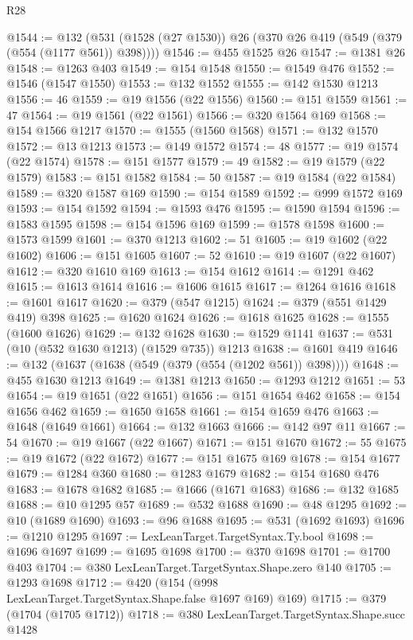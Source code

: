 \begin{lexlean}{R28}
\begin{coremodule}
@1544 := @132 (@531 (@1528 (@27 @1530)) @26 (@370 @26 @419 (@549 (@379 (@554 (@1177 @561)) @398))))
@1546 := @455 @1525 @26
@1547 := @1381 @26
@1548 := @1263 @403
@1549 := @154 @1548
@1550 := @1549 @476
@1552 := @1546 (@1547 @1550)
@1553 := @132 @1552
@1555 := @142 @1530 @1213
@1556 := 46
@1559 := @19 @1556 (@22 @1556)
@1560 := @151 @1559
@1561 := 47
@1564 := @19 @1561 (@22 @1561)
@1566 := @320 @1564 @169
@1568 := @154 @1566 @1217
@1570 := @1555 (@1560 @1568)
@1571 := @132 @1570
@1572 := @13 @1213
@1573 := @149 @1572
@1574 := 48
@1577 := @19 @1574 (@22 @1574)
@1578 := @151 @1577
@1579 := 49
@1582 := @19 @1579 (@22 @1579)
@1583 := @151 @1582
@1584 := 50
@1587 := @19 @1584 (@22 @1584)
@1589 := @320 @1587 @169
@1590 := @154 @1589
@1592 := @999 @1572 @169
@1593 := @154 @1592
@1594 := @1593 @476
@1595 := @1590 @1594
@1596 := @1583 @1595
@1598 := @154 @1596 @169
@1599 := @1578 @1598
@1600 := @1573 @1599
@1601 := @370 @1213
@1602 := 51
@1605 := @19 @1602 (@22 @1602)
@1606 := @151 @1605
@1607 := 52
@1610 := @19 @1607 (@22 @1607)
@1612 := @320 @1610 @169
@1613 := @154 @1612
@1614 := @1291 @462
@1615 := @1613 @1614
@1616 := @1606 @1615
@1617 := @1264 @1616
@1618 := @1601 @1617
@1620 := @379 (@547 @1215)
@1624 := @379 (@551 @1429 @419) @398
@1625 := @1620 @1624
@1626 := @1618 @1625
@1628 := @1555 (@1600 @1626)
@1629 := @132 @1628
@1630 := @1529 @1141
@1637 := @531 (@10 (@532 @1630 @1213) (@1529 @735)) @1213
@1638 := @1601 @419
@1646 := @132 (@1637 (@1638 (@549 (@379 (@554 (@1202 @561)) @398))))
@1648 := @455 @1630 @1213
@1649 := @1381 @1213
@1650 := @1293 @1212
@1651 := 53
@1654 := @19 @1651 (@22 @1651)
@1656 := @151 @1654 @462
@1658 := @154 @1656 @462
@1659 := @1650 @1658
@1661 := @154 @1659 @476
@1663 := @1648 (@1649 @1661)
@1664 := @132 @1663
@1666 := @142 @97 @11
@1667 := 54
@1670 := @19 @1667 (@22 @1667)
@1671 := @151 @1670
@1672 := 55
@1675 := @19 @1672 (@22 @1672)
@1677 := @151 @1675 @169
@1678 := @154 @1677
@1679 := @1284 @360
@1680 := @1283 @1679
@1682 := @154 @1680 @476
@1683 := @1678 @1682
@1685 := @1666 (@1671 @1683)
@1686 := @132 @1685
@1688 := @10 @1295 @57
@1689 := @532 @1688
@1690 := @48 @1295
@1692 := @10 (@1689 @1690)
@1693 := @96 @1688
@1695 := @531 (@1692 @1693)
@1696 := @1210 @1295
@1697 := LexLeanTarget.TargetSyntax.Ty.bool
@1698 := @1696 @1697
@1699 := @1695 @1698
@1700 := @370 @1698
@1701 := @1700 @403
@1704 := @380 LexLeanTarget.TargetSyntax.Shape.zero @140
@1705 := @1293 @1698
@1712 := @420 (@154 (@998 LexLeanTarget.TargetSyntax.Shape.false @1697 @169) @169)
@1715 := @379 (@1704 (@1705 @1712))
@1718 := @380 LexLeanTarget.TargetSyntax.Shape.succ @1428

\end{coremodule}
\end{lexlean}
